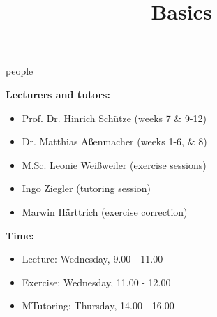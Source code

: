 


\newcommand*\POS[1]{\textsubscript{\texttt{#1}}} %
\usepackage{qtree} %

\newcommand{\learninggoals}{
\item Understand the scope of the course
\item Answers to all open question
\item Get an impression of the workload}

\title{Basics}
\date{}




\begin{vbframe}{people}

\vfill

\textbf{Lecturers and tutors:}

	\begin{itemize}
		\item Prof. Dr. Hinrich Schütze (weeks 7 \& 9-12)
		\item Dr. Matthias Aßenmacher (weeks 1-6, \& 8)
		\item M.Sc. Leonie Weißweiler (exercise sessions)
		\item Ingo Ziegler (tutoring session)
		\item Marwin Härttrich (exercise correction)
	\end{itemize}

\textbf{Time:}

	\begin{itemize}
		\item Lecture: Wednesday, 9.00 - 11.00
		\item Exercise: Wednesday, 11.00 - 12.00
		\item MTutoring: Thursday, 14.00 - 16.00
	\end{itemize}

\vfill

\end{vbframe}



